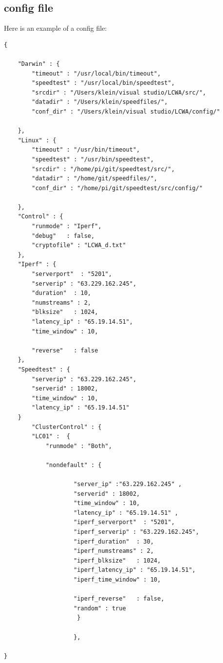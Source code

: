 \documentclass[11pt]{article}
\begin{document}
\subsection{config file}
Here is an example of a config file:
\begin{verbatim}
{

    "Darwin" : {
        "timeout" : "/usr/local/bin/timeout",
        "speedtest" : "/usr/local/bin/speedtest",
        "srcdir" : "/Users/klein/visual studio/LCWA/src/",
        "datadir" : "/Users/klein/speedfiles/",
        "conf_dir" : "/Users/klein/visual studio/LCWA/config/"

    },
    "Linux" : {
        "timeout" : "/usr/bin/timeout",
        "speedtest" : "/usr/bin/speedtest",
        "srcdir" : "/home/pi/git/speedtest/src/",
        "datadir" : "/home/git/speedfiles/",
        "conf_dir" : "/home/pi/git/speedtest/src/config/"

    },
    "Control" : {
        "runmode" : "Iperf",
        "debug"   : false,
        "cryptofile" : "LCWA_d.txt"
    },
    "Iperf" : {
        "serverport"  : "5201",
        "serverip" : "63.229.162.245",
        "duration"  : 10,
        "numstreams" : 2,
        "blksize"   : 1024,
        "latency_ip" : "65.19.14.51",
        "time_window" : 10,

        "reverse"   : false
    },
    "Speedtest" : {
        "serverip" : "63.229.162.245",
        "serverid" : 18002,
        "time_window" : 10,
        "latency_ip" : "65.19.14.51" 
    }
        "ClusterControl" : {
        "LC01" :  {
            "runmode" : "Both",

            "nondefault" : {

                    "server_ip" :"63.229.162.245" ,
                    "serverid" : 18002,
                    "time_window" : 10,
                    "latency_ip" : "65.19.14.51" ,
                    "iperf_serverport"  : "5201",
                    "iperf_serverip" : "63.229.162.245",
                    "iperf_duration"  : 30,
                    "iperf_numstreams" : 2,
                    "iperf_blksize"   : 1024,
                    "iperf_latency_ip" : "65.19.14.51",
                    "iperf_time_window" : 10,
            
                    "iperf_reverse"   : false,
                    "random" : true
                     }

                    },

}

\end{verbatim}
\end{document}
